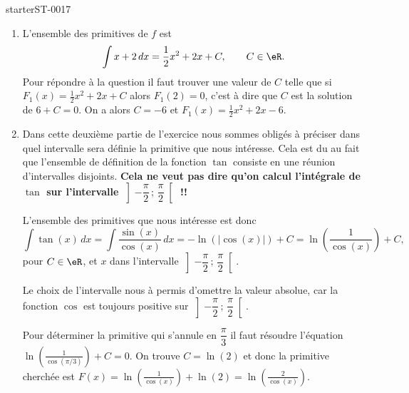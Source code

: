 
\begin{corrige}{starterST-0017}

\begin{enumerate}
  \item L'ensemble des primitives de $f$ est 
    \begin{equation*}
      \int x+2 \, dx = \frac{1}{2} x^2 + 2x + C, \qquad C \in \eR. 
    \end{equation*}
    Pour répondre à la question il faut trouver une valeur de $C$ telle que si $F_{1}(x)=\frac{1}{2} x^2 + 2x + C $ alors $F_{1}(2) = 0$, c'est à dire que $C$ est la solution de $6 + C = 0$. On a alors $C = -6$ et  $F_{1}(x)=\frac{1}{2} x^2 + 2x -6 $. 
    \item 
      \begin{Aretenir}
        Dans cette deuxième partie de l'exercice nous sommes obligés à préciser dans quel intervalle sera définie la primitive que nous intéresse. Cela est du au fait que l'ensemble de définition de la fonction $\tan$ consiste en une réunion d'intervalles disjoints. {\bf Cela ne veut pas dire qu'on calcul l'intégrale de $\tan$ sur l'intervalle $\left]-\dfrac{\pi}{2}\,;\,\dfrac{\pi}{2}\right[$ !!}
      \end{Aretenir}

      L'ensemble des primitives que nous intéresse est donc  
      \begin{equation*}
        \int \tan(x) \, dx = \int \frac{\sin(x)}{\cos(x)} \, dx = -\ln\left(|\cos(x)|\right)+C  = \ln\left(\frac{1}{\cos(x)}\right)+C,
      \end{equation*}
      pour $C \in \eR$, et $x$ dans  l'intervalle $\left]-\dfrac{\pi}{2}\,;\,\dfrac{\pi}{2}\right[$.
  
      Le choix de l'intervalle nous à permis d'omettre la valeur absolue, car la fonction $\cos$ est toujours positive sur $\left]-\dfrac{\pi}{2}\,;\,\dfrac{\pi}{2}\right[$.
    
            Pour déterminer la primitive qui s'annule en $\dfrac{\pi}{3}$ il faut résoudre l'équation $\ln\left(\frac{1}{\cos(\pi/3)}\right)+C = 0$. On trouve $C = \ln(2)$ et donc la primitive cherchée  est $F(x) = \ln\left(\frac{1}{\cos(x)}\right)+\ln(2) = \ln\left(\frac{2}{\cos(x)}\right)$.
  \end{enumerate}

\end{corrige}
